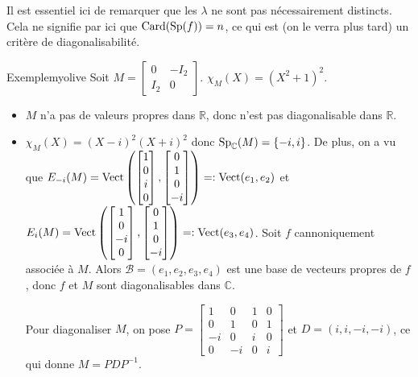     Il est essentiel ici de remarquer que les $\lambda$ ne sont pas nécessairement distincts. Cela ne signifie par ici que $\operatorname{Card}(\operatorname{Sp}(f)) = n$, ce qui est (on le verra plus tard) un critère de diagonalisabilité.

    \begin{omed}{Exemple}{myolive}
        Soit $M = \begin{bmatrix}
            0 & -I_2 \\
            I_2 & 0
        \end{bmatrix}$. $\chi_M(X) = (X^2 + 1)^2$.
        \begin{itemize}
            \item $M$ n’a pas de valeurs propres dans $\mathbb{R}$, donc n’est pas diagonalisable dans $\mathbb{R}$.
            \item $\chi_M(X) = (X-i)^2 (X+i)^2$ donc $\operatorname{Sp}_{\mathbb{C}}(M) = \left\{-i, i\right\}$. De plus, on a vu que $E_{-i}(M) = \operatorname{Vect}\left(\begin{bmatrix}
                    1 \\
                    0 \\
                    i \\
                    0
                \end{bmatrix}, \begin{bmatrix}
                    0 \\ 
                    1 \\
                    0 \\
                    -i
                \end{bmatrix}\right) =: \operatorname{Vect}(e_1, e_2)$ et $E_{i}(M) = \operatorname{Vect}\left(\begin{bmatrix}
                    1 \\
                    0 \\
                    -i \\
                    0
                \end{bmatrix}, \begin{bmatrix}
                    0 \\
                    1 \\
                    0 \\
                    -i
                \end{bmatrix}\right) =: \operatorname{Vect}(e_3, e_4)$. Soit $f$ cannoniquement associée à $M$. Alors $\mathcal{B} = (e_1, e_2, e_3, e_4)$ est une base de vecteurs propres de $f$, donc $f$ et $M$ sont diagonalisables dans $\mathbb{C}$.
                
                Pour diagonaliser $M$, on pose $P = \begin{bmatrix}
                    1 & 0 & 1 & 0 \\
                    0 & 1 & 0 & 1 \\
                    -i & 0 & i & 0 \\
                    0 & -i & 0 & i
                \end{bmatrix}$ et $D = (i, i, -i, -i)$, ce qui donne $M = P D P^{-1}$.
        \end{itemize}
    \end{omed}

